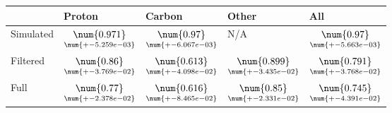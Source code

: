 \begin{tabular}{lllll}
\toprule
{} &                                              Proton &                                              Carbon &                                               Other &                                                 All \\
\midrule
Simulated &  $\underset{\num{+- 5.259e-03 }  }{\num{ 0.971 } }$ &  $\underset{\num{+- 6.067e-03 }  }{\num{ 0.97 } }$ &  N/A &  $\underset{\num{+- 5.663e-03 }  }{\num{ 0.97 } }$ \\
Filtered  &  $\underset{\num{+- 3.769e-02 }  }{\num{ 0.86 } }$ &  $\underset{\num{+- 4.098e-02 }  }{\num{ 0.613 } }$ &  $\underset{\num{+- 3.435e-02 }  }{\num{ 0.899 } }$ &  $\underset{\num{+- 3.768e-02 }  }{\num{ 0.791 } }$ \\
Full      &  $\underset{\num{+- 2.378e-02 }  }{\num{ 0.77 } }$ &  $\underset{\num{+- 8.465e-02 }  }{\num{ 0.616 } }$ &  $\underset{\num{+- 2.331e-02 }  }{\num{ 0.85 } }$ &  $\underset{\num{+- 4.391e-02 }  }{\num{ 0.745 } }$ \\
\bottomrule
\end{tabular}
